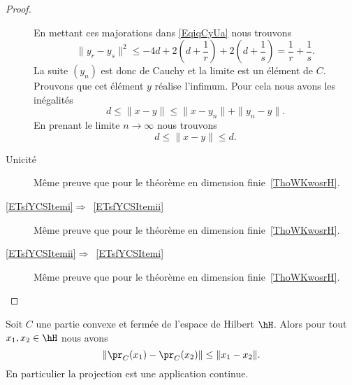 \begin{proof}
\begin{description}
\begin{equation}
    \end{equation}
    En mettant ces majorations dans \eqref{EqiqCyUa} nous trouvons
    \begin{equation}
        \| y_r-y_s \|^2\leq -4d+2\left( d+\frac{1}{ r } \right)+2\left( d+\frac{1}{ s } \right)=\frac{1}{ r }+\frac{1}{ s }.
    \end{equation}
    La suite \( (y_n)\) est donc de Cauchy et la limite est un élément de \( C\). Prouvons que cet élément \( y\) réalise l'infimum. Pour cela nous avons les inégalités
    \begin{equation}
        d\leq \| x-y \|\leq\| x-y_n \|+\| y_n-y \|.
    \end{equation}
    En prenant le limite \( n\to\infty\) nous trouvons
    \begin{equation}
        d\leq \| x-y \|\leq d.
    \end{equation}

        \item[Unicité]

            Même preuve que pour le théorème en dimension finie~\ref{ThoWKwosrH}.

        \item[\ref{ETsfYCSItemi}\( \Rightarrow\)~\ref{ETsfYCSItemii}]

            Même preuve que pour le théorème en dimension finie~\ref{ThoWKwosrH}.
        \item[\ref{ETsfYCSItemii}\( \Rightarrow\)~\ref{ETsfYCSItemi}]

            Même preuve que pour le théorème en dimension finie~\ref{ThoWKwosrH}.

    \end{description}
\end{proof}

\begin{proposition}     \label{PropAXJpCe}
    Soit \( C\) une partie convexe et fermée de l'espace de Hilbert \( \hH\). Alors pour tout \( x_1,x_2\in\hH\) nous avons
    \begin{equation}
        \| \pr_C(x_1)-\pr_C(x_2) \|\leq \| x_1-x_2 \|.
    \end{equation}
    En particulier la projection est une application continue.
\end{proposition}

